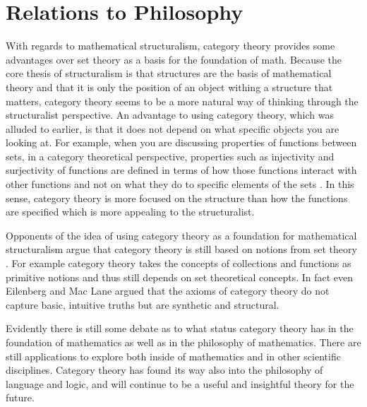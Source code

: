 \documentclass[11pt]{article}
\theoremstyle{definition}
\begin{document}
\section{Relations to Philosophy}
With regards to mathematical structuralism, category theory provides some advantages over set theory as a basis for the foundation of math.%
Because the core thesis of structuralism is that structures are the basis of mathematical theory and that it is only the position of an object withing a structure that matters, category theory seems to be a more natural way of thinking through the structuralist perspective.
An advantage to using category theory, which was alluded to earlier, is that it does not depend on what specific objects you are looking at.
For example, when you are discussing properties of functions between sets, in a category theoretical perspective, properties such as injectivity and surjectivity of functions are defined in terms of how those functions interact with other functions and not on what they do to specific elements of the sets \cite{PeruzziA.2006Tmoc}.
In this sense, category theory is more focused on the structure than how the functions are specified which is more appealing to the structuralist.


Opponents of the idea of using category theory as a foundation for mathematical structuralism argue that category theory is still based on notions from set theory \cite{sep-structuralism-mathematics}.
For example category theory takes the concepts of collections and functions as primitive notions and thus still depends on set theoretical concepts.
In fact even Eilenberg and Mac Lane argued that the axioms of category theory do not capture basic, intuitive truths but are synthetic and structural.

Evidently there is still some debate as to what status category theory has in the foundation of mathematics as well as in the philosophy of mathematics.
There are still applications to explore both inside of mathematics and in other scientific disciplines.
Category theory has found its way also into the philosophy of language and logic, and will continue to be a useful and insightful theory for the future.  

\clearpage


\end{document}
